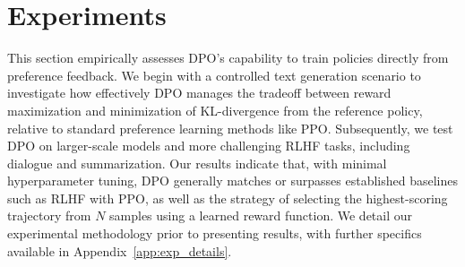 \section{Experiments}
This section empirically assesses DPO’s capability to train policies directly from preference feedback. We begin with a controlled text generation scenario to investigate how effectively DPO manages the tradeoff between reward maximization and minimization of KL-divergence from the reference policy, relative to standard preference learning methods like PPO. Subsequently, we test DPO on larger-scale models and more challenging RLHF tasks, including dialogue and summarization. Our results indicate that, with minimal hyperparameter tuning, DPO generally matches or surpasses established baselines such as RLHF with PPO, as well as the strategy of selecting the highest-scoring trajectory from $N$ samples using a learned reward function. We detail our experimental methodology prior to presenting results, with further specifics available in Appendix~\ref{app:exp_details}.

